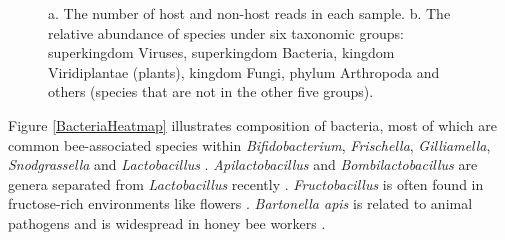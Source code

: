 \documentclass[11pt]{article}
\begin{document}
\begin{figure}[H]
\begin{subfigure}
        \end{subfigure}
        \vfill
        \caption{a. The number of host and non-host reads in each sample. 
        b. The relative abundance of species under six taxonomic groups: superkingdom Viruses, superkingdom Bacteria, kingdom Viridiplantae (plants), kingdom Fungi, phylum Arthropoda and others (species that are not in the other five groups).}
        \label{GroupAbundance}
        \end{figure}
      
    Figure \ref{BacteriaHeatmap} illustrates composition of bacteria, most of which are common bee-associated species within \textit{Bifidobacterium}, \textit{Frischella}, \textit{Gilliamella}, \textit{Snodgrassella} and \textit{Lactobacillus} \citep{koch2011bacterial,moran2015genomics,kwong2017dynamic}. 
    \textit{Apilactobacillus} and \textit{Bombilactobacillus} are genera separated from \textit{Lactobacillus} recently \citep{zheng2020taxonomic}. 
    \textit{Fructobacillus} is often found in fructose-rich environments like flowers \citep{endo2014genus}. 
    \textit{Bartonella apis} is related to animal pathogens \citep{kevsnerova2016bartonella} and is widespread in honey bee workers \citep{raymann2018role}. 
\end{document}
